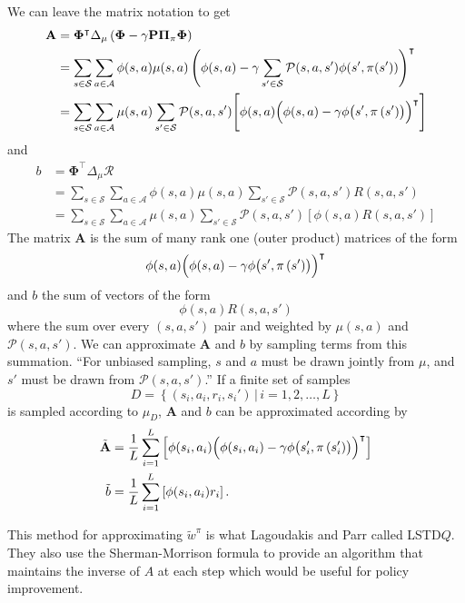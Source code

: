 \documentclass{article}
\newcommand{\set}[1]{\left\{#1\right\}}
\newcommand{\parens}[1]{\left(#1\right)}
\newcommand{\bra}[1]{\left[#1\right]}
\newcommand{\g}{\,|\,}
\begin{document}
We can leave the matrix notation to get
\begin{align*}
	\mathbf{A}&=\mathbf{\Phi}^\intercal\Delta_{\mu}\parens{\mathbf{\Phi}-\gamma \mathbf{P}\mathbf{\Pi}_{\pi}\mathbf{\Phi}}\\
	&=\sum_{s\in\mathcal{S}}\sum_{a\in\mathcal{A}}\phi(s,a)\mu(s,a)
		\parens{\phi(s,a)-\gamma\sum_{s'\in \mathcal{S}}\mathcal{P}(s,a,s')\phi(s',\pi(s'))}^\intercal\\
		&=\sum_{s\in\mathcal{S}}\sum_{a\in\mathcal{A}}\mu(s,a)
		\sum_{s'\in\mathcal{S}}\mathcal{P}(s,a,s')\Biggl[
		\phi(s,a)\Bigl(\phi(s,a)-\gamma\phi\bigl(s',\pi\left(s'\right)\bigr)\Bigr)^{\intercal}
		\Biggr]
\end{align*}
and
\begin{align*}
	b&=\mathbf{\Phi}^{\intercal}\Delta_{\mu}\mathcal{R}\\
	&=\sum_{s\in\mathcal{S}}\sum_{a\in\mathcal{A}}\phi(s,a)\mu(s,a)\sum_{s'\in \mathcal{S}}
		\mathcal{P}(s,a,s')R(s,a,s')\\
	&=\sum_{s\in\mathcal{S}}\sum_{a\in\mathcal{A}}\mu(s,a)\sum_{s'\in \mathcal{S}}
		\mathcal{P}(s,a,s')\bra{\phi(s,a)R(s,a,s')}
\end{align*}
The matrix $\mathbf{A}$ is the sum of many rank one (outer product) matrices of the form
\[
	\phi(s,a)\Bigl(\phi(s,a)-\gamma\phi\bigl(s',\pi\left(s'\right)\bigr)\Bigr)^{\intercal}
\]
and $b$ the sum of vectors of the form
\[
	\phi(s,a)R(s,a,s')
\]
where the sum over every $(s,a,s')$ pair and weighted by $\mu(s,a)$  and $\mathcal{P}(s,a,s')$.
We can approximate $\mathbf{A}$ and $b$ by sampling terms from this summation. ``For unbiased sampling, $s$ and $a$ must be drawn jointly from $\mu$, and $s'$ must be drawn from $\mathcal{P}(s,a,s')$.''
If a finite set of samples 
\[
	D=\set{(s_{i},a_{i},r_{i},s_{i}')\g i=1,2,\ldots,L}
\]
is sampled according to $\mu_{D}$, $\mathbf{A}$ and $b$ can be approximated according by
\begin{align*}
	\tilde{\mathbf{A}}&=\frac{1}{L}\sum_{i=1}^{L}\bra{\phi(s_{i},a_{i})\Bigl(\phi(s_{i},a_{i})-\gamma\phi\bigl(s_{i}',\pi\left(s_{i}'\right)\bigr)\Bigr)^{\intercal}}\\
	\tilde{b}&=\frac{1}{L}\sum_{i=1}^{L}\bra{\phi(s_{i},a_{i})r_{i}}.
\end{align*}

This method for approximating $\tilde{w}^{\pi}$ is what Lagoudakis and Parr called LSTD$Q$. They also use the Sherman-Morrison formula to provide an algorithm that maintains the inverse of $A$ at each step which would be useful for policy improvement. 
\end{document}
